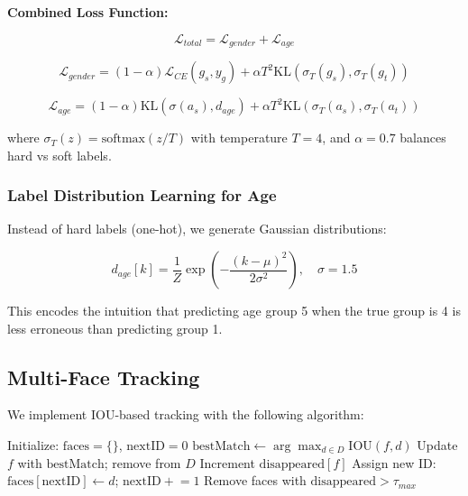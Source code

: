 \documentclass[12pt,a4paper]{article}
\begin{document}
\textbf{Combined Loss Function:}

\begin{equation}
    \mathcal{L}_{total} = \mathcal{L}_{gender} + \mathcal{L}_{age}
\end{equation}

\begin{equation}
    \mathcal{L}_{gender} = (1-\alpha) \mathcal{L}_{CE}(g_s, y_g) + \alpha T^2 \text{KL}(\sigma_T(g_s), \sigma_T(g_t))
\end{equation}

\begin{equation}
    \mathcal{L}_{age} = (1-\alpha) \text{KL}(\sigma(a_s), d_{age}) + \alpha T^2 \text{KL}(\sigma_T(a_s), \sigma_T(a_t))
\end{equation}

where $\sigma_T(z) = \text{softmax}(z/T)$ with temperature $T=4$, and $\alpha=0.7$ balances hard vs soft labels.

\subsubsection{Label Distribution Learning for Age}

Instead of hard labels (one-hot), we generate Gaussian distributions:

\begin{equation}
    d_{age}[k] = \frac{1}{Z} \exp\left(-\frac{(k - \mu)^2}{2\sigma^2}\right), \quad \sigma = 1.5
\end{equation}

This encodes the intuition that predicting age group 5 when the true group is 4 is less erroneous than predicting group 1.

\subsection{Multi-Face Tracking}

We implement IOU-based tracking with the following algorithm:

\begin{algorithm}[H]
\caption{IOU-based Face Tracking}
\begin{algorithmic}[1]
\State Initialize: $\text{faces} = \{\}$, $\text{nextID} = 0$
        \State $\text{bestMatch} \gets \arg\max_{d \in D} \text{IOU}(f, d)$
            \State Update $f$ with $\text{bestMatch}$; remove from $D$
        \Else
            \State Increment $\text{disappeared}[f]$
        \EndIf
    \EndFor
        \State Assign new ID: $\text{faces}[\text{nextID}] \gets d$; $\text{nextID} \mathrel{+}= 1$
    \EndFor
    \State Remove faces with $\text{disappeared} > \tau_{max}$
\EndFor
\end{algorithmic}
\end{algorithm}
\end{document}
